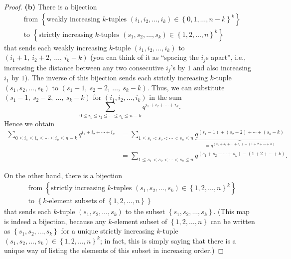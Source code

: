 \begin{proof}
\textbf{(b)} There is a bijection%
\begin{align*}
&  \text{from }\left\{  \text{weakly increasing }k\text{-tuples }\left(
i_{1},i_{2},\ldots,i_{k}\right)  \in\left\{  0,1,\ldots,n-k\right\}
^{k}\right\} \\
&  \text{to }\left\{  \text{strictly increasing }k\text{-tuples }\left(
s_{1},s_{2},\ldots,s_{k}\right)  \in\left\{  1,2,\ldots,n\right\}
^{k}\right\}
\end{align*}
that sends each weakly increasing $k$-tuple $\left(  i_{1},i_{2},\ldots
,i_{k}\right)  $ to $\left(  i_{1}+1,\ i_{2}+2,\ \ldots,\ i_{k}+k\right)  $
(you can think of it as \textquotedblleft spacing the $i_{j}$s
apart\textquotedblright, i.e., increasing the distance between any two
consecutive $i_{j}$'s by $1$ and also increasing $i_{1}$ by $1$). The inverse
of this bijection sends each strictly increasing $k$-tuple $\left(
s_{1},s_{2},\ldots,s_{k}\right)  $ to $\left(  s_{1}-1,\ s_{2}-2,\ \ldots
,\ s_{k}-k\right)  $. Thus, we can substitute $\left(  s_{1}-1,\ s_{2}%
-2,\ \ldots,\ s_{k}-k\right)  $ for $\left(  i_{1},i_{2},\ldots,i_{k}\right)
$ in the sum%
\[
\sum_{0\leq i_{1}\leq i_{2}\leq\cdots\leq i_{k}\leq n-k}q^{i_{1}+i_{2}%
+\cdots+i_{k}}.
\]
Hence we obtain%
\begin{align*}
\sum_{0\leq i_{1}\leq i_{2}\leq\cdots\leq i_{k}\leq n-k}q^{i_{1}+i_{2}%
+\cdots+i_{k}}  &  =\sum_{1\leq s_{1}<s_{2}<\cdots<s_{k}\leq n}%
\underbrace{q^{\left(  s_{1}-1\right)  +\left(  s_{2}-2\right)  +\cdots
+\left(  s_{k}-k\right)  }}_{=q^{\left(  s_{1}+s_{2}+\cdots+s_{k}\right)
-\left(  1+2+\cdots+k\right)  }}\\
&  =\sum_{1\leq s_{1}<s_{2}<\cdots<s_{k}\leq n}q^{\left(  s_{1}+s_{2}%
+\cdots+s_{k}\right)  -\left(  1+2+\cdots+k\right)  }.
\end{align*}


On the other hand, there is a bijection%
\begin{align*}
&  \text{from }\left\{  \text{strictly increasing }k\text{-tuples }\left(
s_{1},s_{2},\ldots,s_{k}\right)  \in\left\{  1,2,\ldots,n\right\}
^{k}\right\} \\
&  \text{to }\left\{  k\text{-element subsets of }\left\{  1,2,\ldots
,n\right\}  \right\}
\end{align*}
that sends each $k$-tuple $\left(  s_{1},s_{2},\ldots,s_{k}\right)  $ to the
subset $\left\{  s_{1},s_{2},\ldots,s_{k}\right\}  $. (This map is indeed a
bijection, because any $k$-element subset of $\left\{  1,2,\ldots,n\right\}  $
can be written as $\left\{  s_{1},s_{2},\ldots,s_{k}\right\}  $ for a unique
strictly increasing $k$-tuple $\left(  s_{1},s_{2},\ldots,s_{k}\right)
\in\left\{  1,2,\ldots,n\right\}  ^{k}$; in fact, this is simply saying that
there is a unique way of listing the elements of this subset in increasing order.)


\end{proof}
